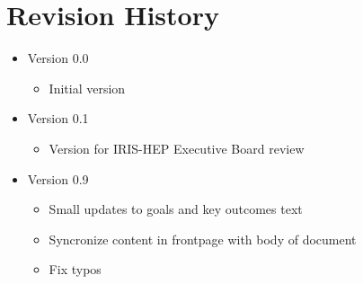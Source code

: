 \documentclass[11pt,letterpaper,fleqn]{article}
\begin{document}
\appendix
\newpage
\section{Revision History}

\vspace{8pt}
\begin{itemize}
  \item Version 0.0
  \vspace{-5pt}
  \begin{itemize}
    \item Initial version
  \end{itemize}
  \item Version 0.1
  \vspace{-5pt}
  \begin{itemize}
    \item Version for IRIS-HEP Executive Board review
  \end{itemize}
  \item Version 0.9
  \vspace{-5pt}
  \begin{itemize}
    \item Small updates to goals and key outcomes text
    \item Syncronize content in frontpage with body of document
    \item Fix typos
  \end{itemize}
\end{itemize}
\end{document}
